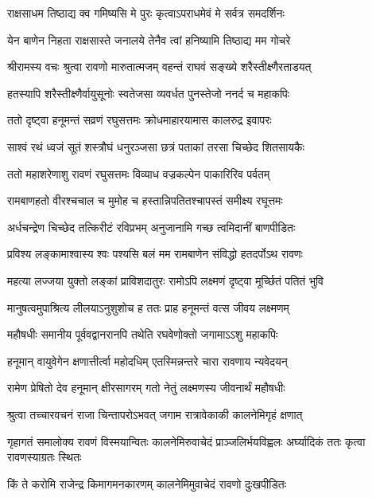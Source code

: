 \twolineshloka
{राक्षसाधम तिष्ठाद्य क्व गमिष्यसि मे पुरः}
{कृत्वाऽपराधमेवं मे सर्वत्र समदर्शिनः} %

\twolineshloka
{येन बाणेन निहता राक्षसास्ते जनालये}
{तेनैव त्वां हनिष्यामि तिष्ठाद्य मम गोचरे} %

\twolineshloka
{श्रीरामस्य वचः श्रुत्वा रावणो मारुतात्मजम्}
{वहन्तं राघवं सङ्ख्ये शरैस्तीक्ष्णैरताडयत्} %

\twolineshloka
{हतस्यापि शरैस्तीक्ष्णैर्वायुसूनोः स्वतेजसा}
{व्यवर्धत पुनस्तेजो ननर्द च महाकपिः} %

\twolineshloka
{ततो दृष्ट्वा हनूमन्तं सव्रणं रघुसत्तमः}
{क्रोधमाहारयामास कालरुद्र इवापरः} %

\twolineshloka
{साश्वं रथं ध्वजं सूतं शस्त्रौघं धनुरञ्जसा}
{छत्रं पताकां तरसा चिच्छेद शितसायकैः} %

\twolineshloka
{ततो महाशरेणाशु रावणं रघुसत्तमः}
{विव्याध वज्रकल्पेन पाकारिरिव पर्वतम्} %

\twolineshloka
{रामबाणहतो वीरश्चचाल च मुमोह च}
{हस्तान्निपतितश्चापस्तं समीक्ष्य रघूत्तमः} %

\twolineshloka
{अर्धचन्द्रेण चिच्छेद तत्किरीटं रविप्रभम्}
{अनुजानामि गच्छ त्वमिदानीं बाणपीडितः} %

\twolineshloka
{प्रविश्य लङ्कामाश्वास्य श्वः पश्यसि बलं मम}
{रामबाणेन संविद्धो हतदर्पोऽथ रावणः} %

\twolineshloka
{महत्या लज्जया युक्तो लङ्कां प्राविशदातुरः}
{रामोऽपि लक्ष्मणं दृष्ट्वा मूर्च्छितं पतितं भुवि} %

\twolineshloka
{मानुषत्वमुपाश्रित्य लीलयाऽनुशुशोच ह}
{ततः प्राह हनूमन्तं वत्स जीवय लक्ष्मणम्} %

\twolineshloka
{महौषधीः समानीय पूर्ववद्वानरानपि}
{तथेति रघवेणोक्तो जगामाऽऽशु महाकपिः} %

\twolineshloka
{हनूमान् वायुवेगेन क्षणात्तीर्त्वा महोदधिम्}
{एतस्मिन्नन्तरे चारा रावणाय न्यवेदयन्} %

\twolineshloka
{रामेण प्रेषितो देव हनूमान् क्षीरसागरम्}
{गतो नेतुं लक्ष्मणस्य जीवनार्थं महौषधीः} %

\twolineshloka
{श्रुत्वा तच्चारवचनं राजा चिन्तापरोऽभवत्}
{जगाम रात्रावेकाकी कालनेमिगृहं क्षणात्} %

\threelineshloka
{गृहागतं समालोक्य रावणं विस्मयान्वितः}
{कालनेमिरुवाचेदं प्राञ्जलिर्भयविह्वलः}
{अर्घ्यादिकं ततः कृत्वा रावणस्याग्रतः स्थितः} %

\twolineshloka
{किं ते करोमि राजेन्द्र किमागमनकारणम्}
{कालनेमिमुवाचेदं रावणो दुःखपीडितः} %

